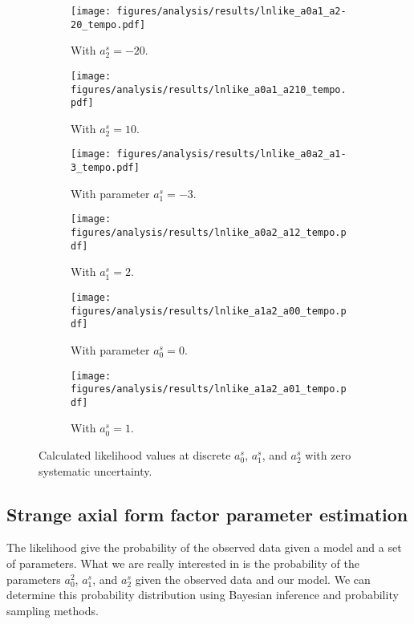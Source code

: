     \begin{figure}[h]
      \centering
      \begin{subfigure}[t]{2.8in}
        \texttt{[image: figures/analysis/results/lnlike\_a0a1\_a2-20\_tempo.pdf]}
        \caption{With $a_2^s = -20$.}
        \label{fig:lka0a1m20}
      \end{subfigure}
      \hspace{2pt}
      \begin{subfigure}[t]{2.8in}
        \texttt{[image: figures/analysis/results/lnlike\_a0a1\_a210\_tempo.pdf]}
        \caption{With $a_2^s = 10$.}
        \label{fig:lka0a1p10}
      \end{subfigure}
      \begin{subfigure}[t]{2.8in}
        \texttt{[image: figures/analysis/results/lnlike\_a0a2\_a1-3\_tempo.pdf]}
        \caption{With parameter $a_1^s = -3$.}
        \label{fig:lka0a2m3}
      \end{subfigure}
      \hspace{2pt}
      \begin{subfigure}[t]{2.8in}
        \texttt{[image: figures/analysis/results/lnlike\_a0a2\_a12\_tempo.pdf]}
        \caption{With $a_1^s = 2$.}
        \label{fig:lka0a2p2}
      \end{subfigure}
      \begin{subfigure}[t]{2.8in}
        \texttt{[image: figures/analysis/results/lnlike\_a1a2\_a00\_tempo.pdf]}
        \caption{With parameter $a_0^s = 0$.}
        \label{fig:lka1a2m0}
      \end{subfigure}
      \hspace{2pt}
      \begin{subfigure}[t]{2.8in}
        \texttt{[image: figures/analysis/results/lnlike\_a1a2\_a01\_tempo.pdf]}
        \caption{With $a_0^s = 1$.}
        \label{fig:lka1a2p1}
      \end{subfigure}
      \caption{Calculated likelihood values at discrete $a_0^s$, $a_1^s$, and
      $a_2^s$ with zero systematic uncertainty.}
      \label{fig:likelihoods}
    \end{figure}

    \FloatBarrier
    

\subsection{Strange axial form factor parameter estimation}\label{sec:deltas}
  The likelihood give the probability of the observed data given a model and a
  set of parameters. What we are really interested in is the probability of the
  parameters $a_0^2$, $a_1^s$, and $a_2^s$ given the observed data and our
  model. We can determine this probability distribution using Bayesian
  inference and probability sampling methods.

